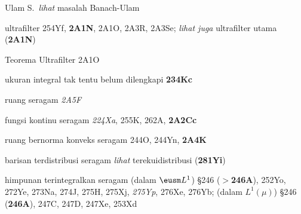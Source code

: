 




\indexmedskip

Ulam S.\ {\it lihat} masalah Banach-Ulam







ultrafilter  254Yf, {\bf 2A1N}, 2A1O, 2A3R, 2A3Se; 
  {\it lihat juga} ultrafilter utama ({\bf 2A1N})




Teorema Ultrafilter 2A1O




ukuran integral tak tentu belum dilengkapi {\bf 234Kc}




















ruang seragam {\it 2A5F}















fungsi kontinu seragam {\it 224Xa}, 255K, 262A,
{\bf 2A2Cc}




ruang bernorma konveks seragam 244O, 244Yn, {\bf 2A4K}


barisan terdistribusi seragam {\it lihat} terekuidistribusi ({\bf 281Yi}) 











himpunan terintegralkan seragam (dalam $\eusm L^1$)
\S246 ($\pmb{>}${\bf 246A}), 252Yo, 272Ye, 273Na, 274J,
275H, 275Xj, {\it 275Yp}, 276Xe, 276Yb; 
  (dalam $L^1(\mu)$) \S246 ({\bf 246A}), 247C, 247D, 247Xe, 253Xd








